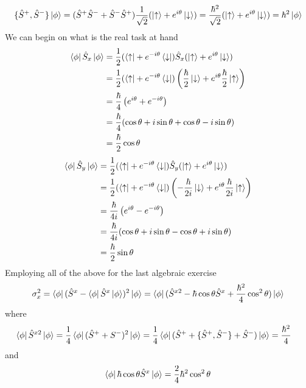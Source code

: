 \documentclass{article}
\begin{document}
\begin{equation*}
\{\hat{S}^+,\hat{S}^-\}\ket{\phi}=(\hat{S}^+\hat{S}^-+\hat{S}^-\hat{S}^+)
\frac{1}{\sqrt{2}}(\ket{\uparrow}+e^{i\theta}\ket{\downarrow})=\frac{\hbar^2}{\sqrt{2}}(\ket{\uparrow}+e^{i\theta}\ket{\downarrow}) =\hbar^2\ket{\phi}
\end{equation*}
We can begin on what is the real task at hand
\begin{align*}
\bra{\phi}\hat{S}_x\ket{\phi} 
&= \frac{1}{2}(\bra{\uparrow}+e^{-i\theta}\bra{\downarrow})\hat{S}_x(\ket{\uparrow}+e^{i\theta}\ket{\downarrow}) \\
&= \frac{1}{2}(\bra{\uparrow}+e^{-i\theta}\bra{\downarrow})\left(\frac{\hbar}{2}\ket{\downarrow}+e^{i\theta}\frac{\hbar}{2}\ket{\uparrow} \right) \\
&= \frac{\hbar}{4}\left(e^{i\theta}+e^{-i\theta} \right)\\ 
&= \frac{\hbar}{4}(\cos{\theta}+i\sin{\theta}+\cos{\theta}-i\sin{\theta}) \\
&= \frac{\hbar}{2}\cos{\theta}
\end{align*}
\begin{align*}
\bra{\phi}\hat{S}_y\ket{\phi} 
&= \frac{1}{2}(\bra{\uparrow}+e^{-i\theta}\bra{\downarrow})\hat{S}_y(\ket{\uparrow}+e^{i\theta}\ket{\downarrow}) \\
&= \frac{1}{2}(\bra{\uparrow}+e^{-i\theta}\bra{\downarrow})\left(-\frac{\hbar}{2i}\ket{\downarrow}+e^{i\theta}\frac{\hbar}{2i}\ket{\uparrow} \right) \\
&= \frac{\hbar}{4i}\left(e^{i\theta}-e^{-i\theta} \right)\\ 
&= \frac{\hbar}{4i}(\cos{\theta}+i\sin{\theta}-\cos{\theta}+i\sin{\theta}) \\
&= \frac{\hbar}{2}\sin{\theta}
\end{align*}
Employing all of the above for the last algebraic exercise
\begin{equation}
\label{eq:sigmax}
\sigma_x^2=\bra{\phi}(\hat{S}^x-\bra{\phi}\hat{S}^x\ket{\phi})^2\ket{\phi} =
\bra{\phi}(\hat{S}^{x2}-\hbar\cos\theta\hat{S}^x+\frac{\hbar^2}{4}\cos^2\theta)\ket{\phi}
\end{equation}
where
\begin{align*}
\bra{\phi}\hat{S}^{x2}\ket{\phi} &= \frac{1}{4}\bra{\phi}(\hat{S}^+ + S^-)^2\ket{\phi}
=\frac{1}{4}\bra{\phi}(\hat{S}^++\{\hat{S}^+,\hat{S}^-\}+\hat{S}^-)\ket{\phi} = \frac{\hbar^2}{4}
\end{align*}
and
\begin{equation*}
\bra{\phi}\hbar\cos\theta\hat{S}^x\ket{\phi} = \frac{2}{4}\hbar^2\cos^2\theta
\end{equation*}
\end{document}
